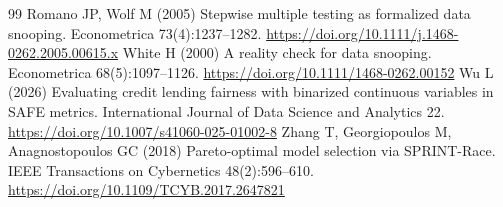\documentclass[pdflatex,sn-mathphys-num,iicol]{sn-jnl}
\theoremstyle{thmstyleone}
\theoremstyle{thmstyletwo}
\begin{document}
\begin{thebibliography}{99}
 Romano JP, Wolf M (2005) Stepwise multiple testing as formalized data snooping. Econometrica 73(4):1237--1282. \url{https://doi.org/10.1111/j.1468-0262.2005.00615.x}
 White H (2000) A reality check for data snooping. Econometrica 68(5):1097--1126. \url{https://doi.org/10.1111/1468-0262.00152}
 Wu L (2026) Evaluating credit lending fairness with binarized continuous variables in SAFE metrics. International Journal of Data Science and Analytics 22. \url{https://doi.org/10.1007/s41060-025-01002-8}
 Zhang T, Georgiopoulos M, Anagnostopoulos GC (2018) Pareto-optimal model selection via SPRINT-Race. IEEE Transactions on Cybernetics 48(2):596--610. \url{https://doi.org/10.1109/TCYB.2017.2647821}
\end{thebibliography}
\end{document}
